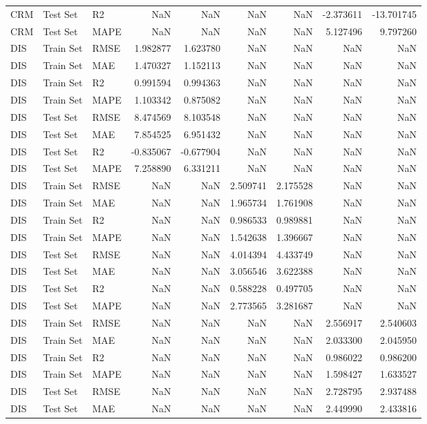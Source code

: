 \begin{tabular}{lllrrrrrr}
CRM & Test Set & R2 & NaN & NaN & NaN & NaN & -2.373611 & -13.701745 \\
CRM & Test Set & MAPE & NaN & NaN & NaN & NaN & 5.127496 & 9.797260 \\
DIS & Train Set & RMSE & 1.982877 & 1.623780 & NaN & NaN & NaN & NaN \\
DIS & Train Set & MAE & 1.470327 & 1.152113 & NaN & NaN & NaN & NaN \\
DIS & Train Set & R2 & 0.991594 & 0.994363 & NaN & NaN & NaN & NaN \\
DIS & Train Set & MAPE & 1.103342 & 0.875082 & NaN & NaN & NaN & NaN \\
DIS & Test Set & RMSE & 8.474569 & 8.103548 & NaN & NaN & NaN & NaN \\
DIS & Test Set & MAE & 7.854525 & 6.951432 & NaN & NaN & NaN & NaN \\
DIS & Test Set & R2 & -0.835067 & -0.677904 & NaN & NaN & NaN & NaN \\
DIS & Test Set & MAPE & 7.258890 & 6.331211 & NaN & NaN & NaN & NaN \\
DIS & Train Set & RMSE & NaN & NaN & 2.509741 & 2.175528 & NaN & NaN \\
DIS & Train Set & MAE & NaN & NaN & 1.965734 & 1.761908 & NaN & NaN \\
DIS & Train Set & R2 & NaN & NaN & 0.986533 & 0.989881 & NaN & NaN \\
DIS & Train Set & MAPE & NaN & NaN & 1.542638 & 1.396667 & NaN & NaN \\
DIS & Test Set & RMSE & NaN & NaN & 4.014394 & 4.433749 & NaN & NaN \\
DIS & Test Set & MAE & NaN & NaN & 3.056546 & 3.622388 & NaN & NaN \\
DIS & Test Set & R2 & NaN & NaN & 0.588228 & 0.497705 & NaN & NaN \\
DIS & Test Set & MAPE & NaN & NaN & 2.773565 & 3.281687 & NaN & NaN \\
DIS & Train Set & RMSE & NaN & NaN & NaN & NaN & 2.556917 & 2.540603 \\
DIS & Train Set & MAE & NaN & NaN & NaN & NaN & 2.033300 & 2.045950 \\
DIS & Train Set & R2 & NaN & NaN & NaN & NaN & 0.986022 & 0.986200 \\
DIS & Train Set & MAPE & NaN & NaN & NaN & NaN & 1.598427 & 1.633527 \\
DIS & Test Set & RMSE & NaN & NaN & NaN & NaN & 2.728795 & 2.937488 \\
DIS & Test Set & MAE & NaN & NaN & NaN & NaN & 2.449990 & 2.433816 \\

\end{tabular}
